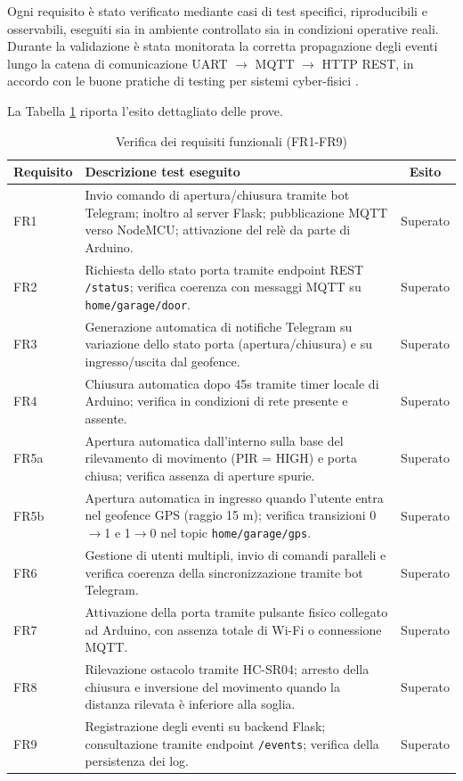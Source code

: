 Ogni requisito è stato verificato mediante casi di test specifici, riproducibili e osservabili, eseguiti sia in ambiente controllato sia in condizioni operative reali. Durante la validazione è stata monitorata la corretta propagazione degli eventi lungo la catena di comunicazione UART $\rightarrow$ MQTT $\rightarrow$ HTTP REST, in accordo con le buone pratiche di testing per sistemi cyber-fisici \cite{Lee2015}.

La Tabella \ref{tab:functional_tests} riporta l'esito dettagliato delle prove.

\begin{table}[h!]
    \centering
    \caption{Verifica dei requisiti funzionali (FR1-FR9)}
    \label{tab:functional_tests}
    \begin{tabular}{|p{1.5cm}|p{9.5cm}|c|}
    \hline
    \textbf{Requisito} & \textbf{Descrizione test eseguito} & \textbf{Esito} \\ \hline
    FR1 & Invio comando di apertura/chiusura tramite bot Telegram; inoltro al server Flask; pubblicazione MQTT verso NodeMCU; attivazione del relè da parte di Arduino. & Superato \\ \hline
    FR2 & Richiesta dello stato porta tramite endpoint REST \texttt{/status}; verifica coerenza con messaggi MQTT su \texttt{home/garage/door}. & Superato \\ \hline
    FR3 & Generazione automatica di notifiche Telegram su variazione dello stato porta (apertura/chiusura) e su ingresso/uscita dal geofence. & Superato \\ \hline
    FR4 & Chiusura automatica dopo 45s tramite timer locale di Arduino; verifica in condizioni di rete presente e assente. & Superato \\ \hline
    FR5a & Apertura automatica dall'interno sulla base del rilevamento di movimento (PIR = HIGH) e porta chiusa; verifica assenza di aperture spurie. & Superato \\ \hline
    FR5b & Apertura automatica in ingresso quando l'utente entra nel geofence GPS (raggio 15 m); verifica transizioni 0$\rightarrow$1 e 1$\rightarrow$0 nel topic \texttt{home/garage/gps}. & Superato \\ \hline
    FR6 & Gestione di utenti multipli, invio di comandi paralleli e verifica coerenza della sincronizzazione tramite bot Telegram. & Superato \\ \hline
    FR7 & Attivazione della porta tramite pulsante fisico collegato ad Arduino, con assenza totale di Wi-Fi o connessione MQTT. & Superato \\ \hline
    FR8 & Rilevazione ostacolo tramite HC-SR04; arresto della chiusura e inversione del movimento quando la distanza rilevata è inferiore alla soglia. & Superato \\ \hline
    FR9 & Registrazione degli eventi su backend Flask; consultazione tramite endpoint \texttt{/events}; verifica della persistenza dei log. & Superato \\ \hline
    \end{tabular}
\end{table}

